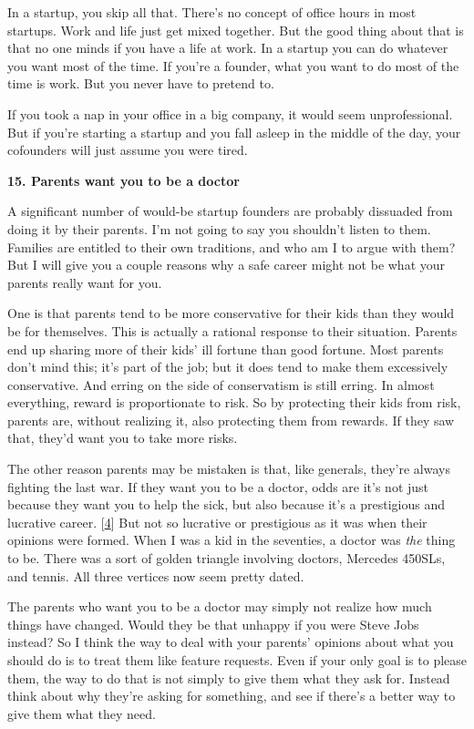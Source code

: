 In a startup, you skip all that. There's no concept of office hours in
most startups. Work and life just get mixed together. But the good thing
about that is that no one minds if you have a life at work. In a startup
you can do whatever you want most of the time. If you're a founder, what
you want to do most of the time is work. But you never have to pretend
to.

If you took a nap in your office in a big company, it would seem
unprofessional. But if you're starting a startup and you fall asleep in
the middle of the day, your cofounders will just assume you were tired.

\textbf{15. Parents want you to be a doctor}

A significant number of would-be startup founders are probably dissuaded
from doing it by their parents. I'm not going to say you shouldn't
listen to them. Families are entitled to their own traditions, and who
am I to argue with them? But I will give you a couple reasons why a safe
career might not be what your parents really want for you.

One is that parents tend to be more conservative for their kids than
they would be for themselves. This is actually a rational response to
their situation. Parents end up sharing more of their kids' ill fortune
than good fortune. Most parents don't mind this; it's part of the job;
but it does tend to make them excessively conservative. And erring on
the side of conservatism is still erring. In almost everything, reward
is proportionate to risk. So by protecting their kids from risk, parents
are, without realizing it, also protecting them from rewards. If they
saw that, they'd want you to take more risks.

The other reason parents may be mistaken is that, like generals, they're
always fighting the last war. If they want you to be a doctor, odds are
it's not just because they want you to help the sick, but also because
it's a prestigious and lucrative career. {[}\hyperref[f4n]{4}{]} But not
so lucrative or prestigious as it was when their opinions were formed.
When I was a kid in the seventies, a doctor was \emph{the} thing to be.
There was a sort of golden triangle involving doctors, Mercedes 450SLs,
and tennis. All three vertices now seem pretty dated.

The parents who want you to be a doctor may simply not realize how much
things have changed. Would they be that unhappy if you were Steve Jobs
instead? So I think the way to deal with your parents' opinions about
what you should do is to treat them like feature requests. Even if your
only goal is to please them, the way to do that is not simply to give
them what they ask for. Instead think about why they're asking for
something, and see if there's a better way to give them what they need.

